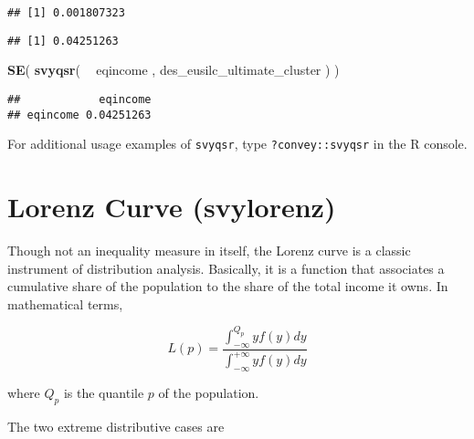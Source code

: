 \documentclass[]{book}
\newenvironment{Shaded}{\begin{snugshade}}{\end{snugshade}}
\newcommand{\CommentTok}[1]{\textcolor[rgb]{0.56,0.35,0.01}{\textit{#1}}}
\newcommand{\KeywordTok}[1]{\textcolor[rgb]{0.13,0.29,0.53}{\textbf{#1}}}
\newcommand{\NormalTok}[1]{#1}
\newcommand{\OperatorTok}[1]{\textcolor[rgb]{0.81,0.36,0.00}{\textbf{#1}}}
\newcommand{\StringTok}[1]{\textcolor[rgb]{0.31,0.60,0.02}{#1}}
\begin{document}
\begin{verbatim}
## [1] 0.001807323
\end{verbatim}

\begin{Shaded}
\end{Shaded}

\begin{verbatim}
## [1] 0.04251263
\end{verbatim}

\begin{Shaded}
\begin{Highlighting}[]
\KeywordTok{SE}\NormalTok{( }\KeywordTok{svyqsr}\NormalTok{( }\OperatorTok{~}\StringTok{ }\NormalTok{eqincome , des_eusilc_ultimate_cluster ) )}
\end{Highlighting}
\end{Shaded}

\begin{verbatim}
##            eqincome
## eqincome 0.04251263
\end{verbatim}

For additional usage examples of \texttt{svyqsr}, type \texttt{?convey::svyqsr} in the R console.

\hypertarget{lorenz-curve-svylorenz}{%
\section{Lorenz Curve (svylorenz)}\label{lorenz-curve-svylorenz}}

Though not an inequality measure in itself, the Lorenz curve is a classic instrument of distribution analysis. Basically, it is a function that associates a cumulative share of the population to the share of the total income it owns. In mathematical terms,

\[
L(p) = \frac{\int_{-\infty}^{Q_p}yf(y)dy}{\int_{-\infty}^{+\infty}yf(y)dy}
\]

where \(Q_p\) is the quantile \(p\) of the population.

The two extreme distributive cases are
\end{document}
